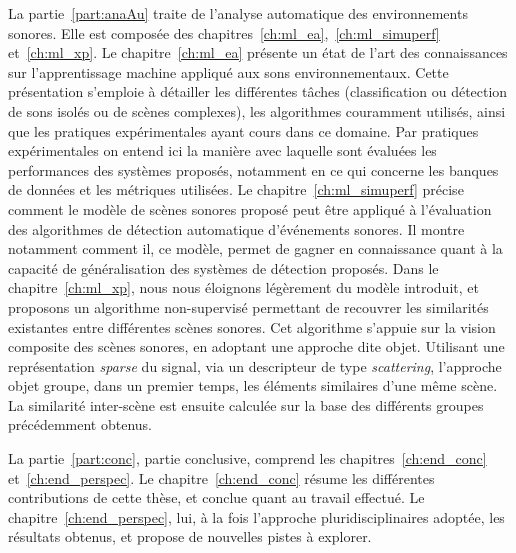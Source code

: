 La partie~\ref{part:anaAu} traite de l'analyse automatique des environnements sonores. Elle est composée des chapitres~\ref{ch:ml_ea},~\ref{ch:ml_simuperf} et~\ref{ch:ml_xp}. Le chapitre~\ref{ch:ml_ea} présente un état de l'art des connaissances sur l'apprentissage machine appliqué aux sons environnementaux. Cette présentation s'emploie à détailler les différentes tâches (classification ou détection de sons isolés ou de scènes complexes), les algorithmes couramment utilisés, ainsi que les pratiques expérimentales ayant cours dans ce domaine. Par pratiques expérimentales on entend ici la manière avec laquelle sont évaluées les performances des systèmes proposés, notamment en ce qui concerne les banques de données et les métriques utilisées. Le chapitre~\ref{ch:ml_simuperf} précise comment le modèle de scènes sonores proposé peut être appliqué à l'évaluation des algorithmes de détection automatique d'événements sonores. Il montre notamment comment il, ce modèle, permet de gagner en connaissance quant à la capacité de généralisation des systèmes de détection proposés. Dans le chapitre~\ref{ch:ml_xp}, nous nous éloignons légèrement du modèle introduit, et proposons un algorithme non-supervisé permettant de recouvrer les similarités existantes entre différentes scènes sonores. Cet algorithme s'appuie sur la vision composite des scènes sonores, en adoptant une approche dite objet. Utilisant une représentation \emph{sparse} du signal, via un descripteur de type \emph{scattering}, l'approche objet groupe, dans un premier temps, les éléments similaires d'une même scène. La similarité inter-scène est ensuite calculée sur la base des différents groupes précédemment obtenus. 

La partie~\ref{part:conc}, partie conclusive, comprend les chapitres~\ref{ch:end_conc} et~\ref{ch:end_perspec}. Le chapitre~\ref{ch:end_conc} résume les différentes contributions de cette thèse, et conclue quant au travail effectué. Le chapitre~\ref{ch:end_perspec}, lui,  à la fois l'approche pluridisciplinaires adoptée, les résultats obtenus, et propose de nouvelles pistes à explorer.





 
  
 





